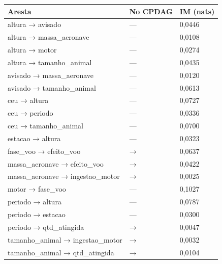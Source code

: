 \begin{tabular}{lll}
\toprule
Aresta & No CPDAG & IM (nats) \\
\midrule
altura → avisado & — & 0,0446 \\
altura → massa\_aeronave & — & 0,0108 \\
altura → motor & — & 0,0274 \\
altura → tamanho\_animal & — & 0,0435 \\
avisado → massa\_aeronave & — & 0,0120 \\
avisado → tamanho\_animal & — & 0,0613 \\
ceu → altura & — & 0,0727 \\
ceu → periodo & — & 0,0336 \\
ceu → tamanho\_animal & — & 0,0700 \\
estacao → altura & — & 0,0323 \\
fase\_voo → efeito\_voo & → & 0,0637 \\
massa\_aeronave → efeito\_voo & → & 0,0422 \\
massa\_aeronave → ingestao\_motor & → & 0,0025 \\
motor → fase\_voo & — & 0,1027 \\
periodo → altura & — & 0,0787 \\
periodo → estacao & — & 0,0300 \\
periodo → qtd\_atingida & → & 0,0047 \\
tamanho\_animal → ingestao\_motor & → & 0,0032 \\
tamanho\_animal → qtd\_atingida & → & 0,0104 \\
\bottomrule
\end{tabular}
